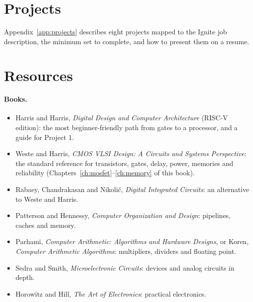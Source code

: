 \section*{Projects}

Appendix~\ref{app:projects} describes eight projects mapped to the Ignite job description, the minimum set to complete, and how to present them on a resume.

\section*{Resources}

\paragraph{Books.}
\begin{itemize}
  \item Harris and Harris, \emph{Digital Design and Computer Architecture} (RISC-V edition): the most beginner-friendly path from gates to a processor, and a guide for Project 1.
  \item Weste and Harris, \emph{CMOS VLSI Design: A Circuits and Systems Perspective}: the standard reference for transistors, gates, delay, power, memories and reliability (Chapters~\ref{ch:mosfet}--\ref{ch:memory} of this book).
  \item Rabaey, Chandrakasan and Nikoli\'c, \emph{Digital Integrated Circuits}: an alternative to Weste and Harris.
  \item Patterson and Hennessy, \emph{Computer Organization and Design}: pipelines, caches and memory.
  \item Parhami, \emph{Computer Arithmetic: Algorithms and Hardware Designs}, or Koren, \emph{Computer Arithmetic Algorithms}: multipliers, dividers and floating point.
  \item Sedra and Smith, \emph{Microelectronic Circuits}: devices and analog circuits in depth.
  \item Horowitz and Hill, \emph{The Art of Electronics}: practical electronics.
\end{itemize}

